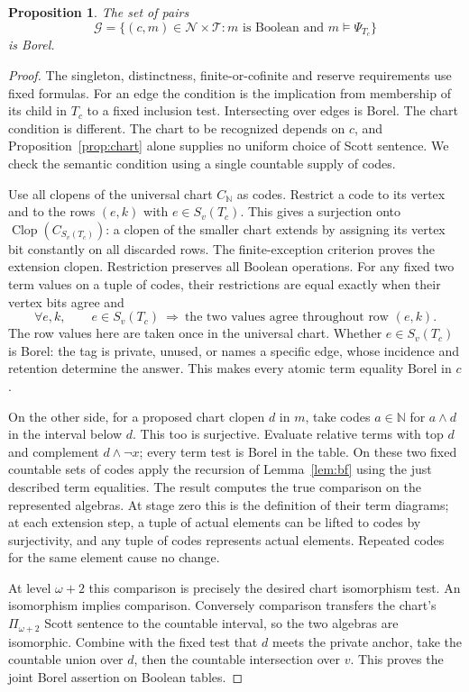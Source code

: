 \documentclass[11pt,letterpaper]{article}
\newtheorem{proposition}[theorem]{Proposition}
\theoremstyle{definition}\newtheorem{definition}[theorem]{Definition}
\newcommand{\N}{\mathbb N}
\newcommand{\Baire}{\mathcal N}
\newcommand{\Clop}{\operatorname{Clop}}
\begin{document}
\begin{proposition}\label{prop:borel}
The set of pairs
\[
 \mathcal G=\{(c,m)\in\Baire\times\mathcal T:
             m\text{ is Boolean and }m\models\Psi_{T_c}\}
\]
is Borel.
\end{proposition}
\begin{proof}
The singleton, distinctness, finite-or-cofinite and reserve requirements
use fixed formulas. For an edge the condition is the implication from
membership of its child in \(T_c\) to a fixed inclusion test. Intersecting
over edges is Borel. The chart condition is different. The chart to be
recognized depends on \(c\), and Proposition~\ref{prop:chart} alone
supplies no uniform choice of Scott sentence. We check the semantic
condition using a single countable supply of codes.

Use all clopens of the universal chart \(C_{\N}\) as codes. Restrict a
code to its vertex and to the rows \((e,k)\) with \(e\in S_v(T_c)\).
This gives a surjection onto \(\Clop(C_{S_v(T_c)})\): a clopen of the
smaller chart extends by assigning its vertex bit constantly on all
discarded rows. The finite-exception criterion proves the extension
clopen. Restriction preserves all Boolean operations. For any fixed two
term values on a tuple of codes, their restrictions are equal exactly when
their vertex bits agree and
\[
 \forall e,k,\qquad e\in S_v(T_c)\ \Longrightarrow\
       \text{the two values agree throughout row }(e,k).
\]
The row values here are taken once in the universal chart. Whether
\(e\in S_v(T_c)\) is Borel: the tag is private, unused, or names a
specific edge, whose incidence and retention determine the answer.
This makes every atomic term equality Borel in \(c\).

On the other side, for a proposed chart clopen \(d\) in \(m\), take codes
\(a\in\N\) for \(a\wedge d\) in the interval below \(d\). This too is
surjective. Evaluate relative terms with top \(d\) and complement
\(d\wedge\neg x\); every term test is Borel in the table. On these two
fixed countable sets of codes apply the recursion of Lemma~\ref{lem:bf}
using the just described term equalities. The result computes the true
comparison on the represented algebras. At stage zero this is the
definition of their term diagrams; at each extension step, a tuple of
actual elements can be lifted to codes by surjectivity, and any tuple of
codes represents actual elements. Repeated codes for the same element
cause no change.

At level \(\omega+2\) this comparison is precisely the desired chart
isomorphism test. An isomorphism implies comparison. Conversely comparison
transfers the chart's \(\Pi_{\omega+2}\) Scott sentence to the countable
interval, so the two algebras are isomorphic. Combine with the fixed test
that \(d\) meets the private anchor, take the countable union over \(d\),
then the countable intersection over \(v\). This proves the joint Borel
assertion on Boolean tables.
\end{proof}
\end{document}
